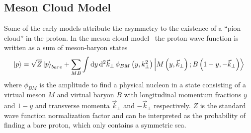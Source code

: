 \documentclass[../main.tex]{subfiles}
\begin{document}
\subsection{Meson Cloud Model}
Some of the early models attribute the asymmetry to the existence of a ``pion cloud'' in the proton.
In the meson cloud model~\cite{kumano1998,speth2002} the proton wave function is written as a sum of meson-baryon states
\begin{equation}
	\ket{p} = \sqrt{Z}\ket{p}_{bare} + \sum_{MB}\int \dd{y} \dd[2]{\vec{k}_\perp} \phi_{BM} \left(y, k^2_\perp\right)\ket{M\left(y, \vec{k}_\perp\right);B\left(1-y, -\vec{k}_\perp\right)}
\end{equation}
where $\phi_{BM}$ is the amplitude to find a physical nucleon in a state consisting of a virtual
meson $M$ and virtual baryon $B$ with longitudinal momentum fractions $y$ and $1-y$ and transverse momenta
$\vec{k}_\perp$ and $-\vec{k}_\perp$ respectively. $Z$ is the standard wave function normalization factor
and can be interpreted as the probability of finding a bare proton, which only contains a symmetric sea.
\end{document}
